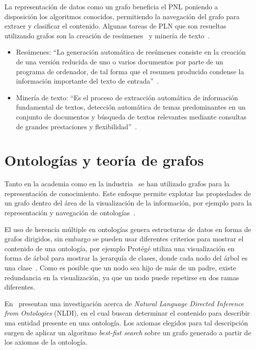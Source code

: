 La representación de datos como un grafo beneficia el PNL poniendo a disposición los algoritmos conocidos, permitiendo la navegación del grafo para extraer y clasificar el contenido. Algunas tareas de PLN que son resueltas utilizando grafos son la creación de resúmenes~\cite{mihalcea2004graph}\cite{erkan2004lexrank} y minería de texto~\cite{Jin:2007:GTR:1244002.1244182}\cite{beliga2015overview}.

\begin{itemize}
    \item Resúmenes: ``La generación automática de resúmenes consiste en la creación de una versión reducida de uno o varios documentos por parte de un programa de ordenador, de tal forma que el resumen producido condense la información importante del texto de entrada''~\cite{plaza2011uso}.
    \item Minería de texto: ``Es el proceso de extracción automática de información fundamental de textos,  detección  automática  de temas  predominantes en un conjunto de documentos y búsqueda de textos relevantes mediante consultas de grandes prestaciones y flexibilidad''~\cite{brun2004articulo}.
\end{itemize}

\section{Ontologías y teoría de grafos}
Tanto en la academia como en la industria~\cite{soylu2018navigating} se han utilizado grafos para la representación de conocimiento. Este enfoque permite explotar las propiedades de un grafo dentro del área de la visualización de la información, por ejemplo para la representación y navegación de ontologías~\cite{escarza2005visualizacion}.

El uso de herencia múltiple en ontologías genera estructuras de datos en forma de grafos dirigidos, sin embargo se pueden usar diferentes criterios para mostrar el contenido de una ontología, por ejemplo Protégé utiliza una visualización en forma de árbol para mostrar la jerarquía de clases, donde cada nodo del árbol es una clase~\cite{protegehierarchy}. Como es posible que un nodo sea hijo de más de un padre, existe redundancia en la visualización, ya que un nodo puede repetirse en dos ramas diferentes.

En~\cite{mellish2008natural} presentan una investigación acerca de \emph{Natural Language Directed Inference from Ontologies} (NLDI), en el cual buscan determinar el contenido para describir una entidad presente en una ontología. Los axiomas elegidos para tal descripción surgen de aplicar un algoritmo \emph{best-fist search} sobre un grafo generado a partir de los axiomas de la ontología.

